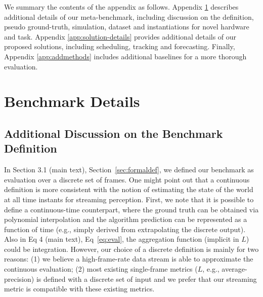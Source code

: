 \ifmuteappendixcite
\renewcommand{\cite}[1]{}
\fi

\ifstandalonesupplement



\setcounter{tocdepth}{2}
{\hypersetup{linkcolor=black}
\tableofcontents
}
\clearpage

\else





\fi

We summary the contents of the appendix as follows. Appendix \ref{app:bench-details} describes additional details of our meta-benchmark, including discussion on the definition, pseudo ground-truth, simulation, dataset and instantiations for novel hardware and task. Appendix \ref{app:solution-details} provides additional details of our proposed solutions, including scheduling, tracking and forecasting. Finally, Appendix \ref{app:addmethods} includes additional baselines for a more thorough evaluation.

\section{Benchmark Details}
\label{app:bench-details}



\subsection{Additional Discussion on the Benchmark Definition}
\label{app:benchdef}

In 
\ifstandalonesupplement
    Section 3.1 (main text),
\else
    Section~\ref{sec:formaldef},
\fi
we defined our benchmark as evaluation over a discrete set of frames. One might point out that a continuous definition is more consistent with the notion of estimating the state of the world at all time instants for streaming perception. First, we note that it is possible to define a continuous-time counterpart, where the ground truth can be obtained via polynomial interpolation and the algorithm prediction can be represented as a function of time (e.g., simply derived from extrapolating the discrete output). Also in
\ifstandalonesupplement
    Eq 4 (main text),
\else
    Eq~\ref{eq:eval},
\fi
the aggregation function (implicit in $L$) could be integration. However, our choice of a discrete definition is mainly for two reasons: (1) we believe a high-frame-rate data stream is able to approximate the continuous evaluation; (2) most existing single-frame metrics ($L$, e.g., average-precision) is defined with a discrete set of input and we prefer that our streaming metric is compatible with these existing metrics. 

